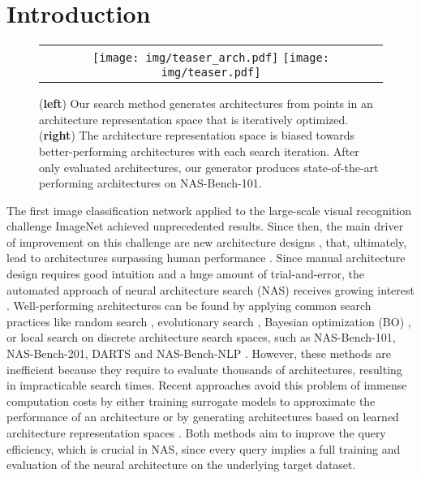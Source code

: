 \documentclass[runningheads]{llncs}
\begin{document}
\section{Introduction}

\begin{figure}[t]

    \centering
    \begin{tabular}{c}
        \texttt{[image: img/teaser\_arch.pdf]} 
        \texttt{[image: img/teaser.pdf]}
    \end{tabular}
    \caption{
        (\textbf{left}) Our search method generates architectures from points in an architecture representation space that is iteratively optimized.
        (\textbf{right}) The architecture representation space is biased towards better-performing architectures with each search iteration.
        After only  evaluated architectures, our generator produces state-of-the-art performing architectures on NAS-Bench-101.
    }
    \label{fig:teaser}

\end{figure}

The first image classification network \cite{2012AlexNet} applied to the large-scale visual recognition challenge ImageNet \cite{2009ImageNet} achieved unprecedented results. Since then, the main driver of improvement on this challenge are new architecture designs \cite{2014VGG,2015GoogleNet}, \cite{2016Inception,2016ResNet} that, ultimately, lead to architectures surpassing human performance \cite{2015ReLU}.
Since manual architecture design requires good intuition and a huge amount of trial-and-error, the automated approach of neural architecture search (NAS) receives growing interest \cite{2017EvolutionaryNAS,2018LearningNAS,2019NB101,2020NB201,2020NBNLP,2021HWNNB}. Well-performing architectures can be found by applying common search practices like random search \cite{2012RandomNAS}, evolutionary search \cite{2017EvolutionaryNAS,2019EvolutionaryNAS}, Bayesian optimization (BO) \cite{2018BONAS,2020BONAS,2021BANANAS}, or local search \cite{2020LocalSearchNAS} on discrete architecture search spaces, such as NAS-Bench-101, NAS-Bench-201, DARTS and NAS-Bench-NLP  \cite{2019NB101,2020NB201,2018DARTS,2020NBNLP}. However, these methods are inefficient because they require to evaluate thousands of architectures, resulting in impracticable search times. Recent approaches avoid this problem of immense computation costs by either training surrogate models to approximate the performance of an architecture \cite{2018DARTS,2019ProxyNAS} or by generating architectures based on learned architecture representation spaces \cite{2019VAENAS,2021SVGe}.
Both methods aim to improve the query efficiency, which is crucial in NAS, since every query implies a full training and evaluation of the neural architecture on the underlying target dataset. 
\end{document}
